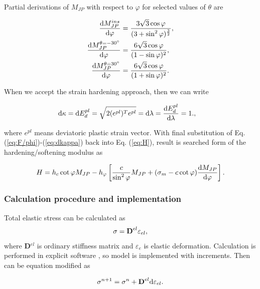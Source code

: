 Partial derivations of $M_{JP}$ with respect to $\varphi$ for selected values of $\theta$ are

\begin{align}
	\dv{M_{JP}^{ins}}{\varphi}					& = \dfrac{3\sqrt{3}\cos \varphi}{(3 + \sin^2 \varphi)^{\frac{3}{2}}},\\
	\dv{M_{JP}^{\theta = \ang{-30}}}{\varphi}	& = \dfrac{6\sqrt{3}\cos \varphi}{(1-\sin \varphi)^2},\\
	\dv{M_{JP}^{\theta = \ang{30}}}{\varphi}	& = \dfrac{6\sqrt{3}\cos \varphi}{(1+\sin \varphi)^2}.
\end{align}


When we accept the strain hardening approach, then we can write

\begin{align}
	\dd\kappa& = \dd E_d^{pl} = \sqrt{2(e^{pl})^T e^{pl} } = \dd \lambda = \dv{E_d^{pl}}{\lambda} = 1.\label{eq:dkappa},
\end{align}

where  $e^{pl}$ means deviatoric plastic strain vector. With final substitution of Eq. (\ref{eq:F/phi})-(\ref{eq:dkappa}) back into Eq. (\ref{eq:H}), result is searched form of the hardening/softening modulus as

\begin{equation}\label{eq:H_final}
	H = h_c \cot\varphi M_{JP} - h_\varphi \left[ \dfrac{c}{\sin^2 \varphi} M_{JP} + (\sigma_m - c \cot \varphi) \dv{M_{JP}}{\varphi} \right].
\end{equation}


\subsubsection{Calculation procedure and implementation}\label{sec:drucker-prager_count}
\indent

Total elastic stress can be calculated as 
\begin{equation}\label{eq:f_sigma}
\sigma = \text{\textbf{D}}^{el} \varepsilon_{el},
\end{equation}
where \textbf{D}$^{el}$ is ordinary stiffness matrix and $\varepsilon_e$ is elastic deformation. Calculation is performed in explicit software \cite{mars}, so model is implemented with increments. Then can be equation modified as

\begin{equation}\label{eq:f_sigma1}
	\sigma^{n+1} = \sigma^n+ \text{\textbf{D}}^{el} \mathrm{d} \varepsilon_{el}.
\end{equation}

